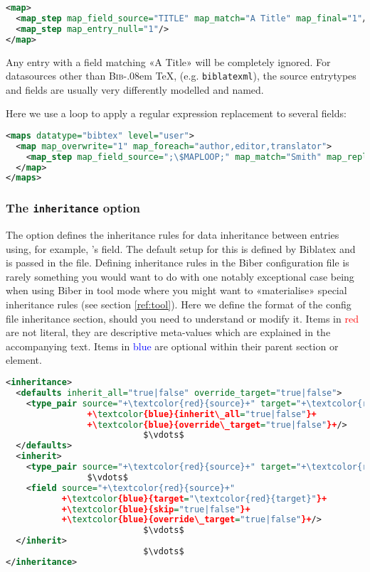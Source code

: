 \documentclass{ltxdockit}
\def\BibTeX{\textsc{Bib}\kern-.08em \TeX}
\newcommand*{\biber}{Biber\xspace}
\newcommand*{\biblatex}{Biblatex\xspace}
\begin{document}
\begin{lstlisting}[language=xml,escapechar=;,mathescape=true]
<map>
  <map_step map_field_source="TITLE" map_match="A Title" map_final="1"/>
  <map_step map_entry_null="1"/>
</map>
\end{lstlisting}

\noindent Any entry with a  field matching «A Title» will
be completely ignored. \bigskip {} For
datasources other than \BibTeX, (e.g. \verb+biblatexml+), the source
entrytypes and fields are usually very differently modelled and named.

\noindent Here we use a loop to apply a regular expression replacement to
several fields:

\begin{lstlisting}[language=xml,escapechar=;,mathescape=true]
<maps datatype="bibtex" level="user">
  <map map_overwrite="1" map_foreach="author,editor,translator">
    <map_step map_field_source=";\$MAPLOOP;" map_match="Smith" map_replace="Jones"/>
  </map>
</maps>
\end{lstlisting}

\bigskip
\subsubsection{The \texttt{inheritance} option}\label{inheritance}

The  option defines the inheritance rules for data
inheritance between entries using, for example, \bibtex's
 field. The default setup for this is defined by
\biblatex and is passed in the  file. Defining inheritance rules
in the \biber configuration file is rarely something you would want to do
with one notably exceptional case being when using \biber in tool mode
where you might want to «materialise» special inheritance rules (see
section \ref{ref:tool}). Here we define the format of the config file
inheritance section, should you need to understand or modify it. Items in
\textcolor{red}{red} are not literal, they are descriptive meta-values
which are explained in the accompanying text. Items in
\textcolor{blue}{blue} are optional within their parent section or element.

\begin{lstlisting}[language=xml,escapechar=+,mathescape=true]
<inheritance>
  <defaults inherit_all="true|false" override_target="true|false">
    <type_pair source="+\textcolor{red}{source}+" target="+\textcolor{red}{target}+"
                +\textcolor{blue}{inherit\_all="true|false"}+
                +\textcolor{blue}{override\_target="true|false"}+/>
                           $\vdots$
  </defaults>
  <inherit>
    <type_pair source="+\textcolor{red}{source}+" target="+\textcolor{red}{target}+"/>
                $\vdots$
    <field source="+\textcolor{red}{source}+"
           +\textcolor{blue}{target="\textcolor{red}{target}"}+
           +\textcolor{blue}{skip="true|false"}+
           +\textcolor{blue}{override\_target="true|false"}+/>
                           $\vdots$
  </inherit>
                           $\vdots$
</inheritance>
\end{lstlisting}
\end{document}
